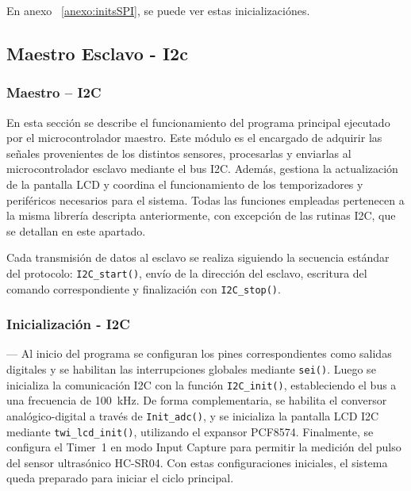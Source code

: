 En anexo ~\ref{anexo:initsSPI}, se puede ver estas inicializaciónes. 


\subsection{Maestro Esclavo - I2c}

\subsubsection{Maestro – I2C}

En esta sección se describe el funcionamiento del programa principal ejecutado por el microcontrolador maestro. Este módulo es el encargado de adquirir las señales provenientes de los distintos sensores, procesarlas y enviarlas al microcontrolador esclavo mediante el bus I2C. Además, gestiona la actualización de la pantalla LCD y coordina el funcionamiento de los temporizadores y periféricos necesarios para el sistema. Todas las funciones empleadas pertenecen a la misma librería descripta anteriormente, con excepción de las rutinas I2C, que se detallan en este apartado.

\vspace{1em}

Cada transmisión de datos al esclavo se realiza siguiendo la secuencia estándar del protocolo: \texttt{I2C\_start()}, envío de la dirección del esclavo, escritura del comando correspondiente y finalización con \texttt{I2C\_stop()}.

\vspace{1em}
\subsubsection{Inicialización - I2C} ---
Al inicio del programa se configuran los pines correspondientes como salidas digitales y se habilitan las interrupciones globales mediante \texttt{sei()}. Luego se inicializa la comunicación I2C con la función \texttt{I2C\_init()}, estableciendo el bus a una frecuencia de 100~kHz. De forma complementaria, se habilita el conversor analógico-digital a través de \texttt{Init\_adc()}, y se inicializa la pantalla LCD I2C mediante \texttt{twi\_lcd\_init()}, utilizando el expansor PCF8574. Finalmente, se configura el Timer~1 en modo Input Capture para permitir la medición del pulso del sensor ultrasónico HC-SR04. Con estas configuraciones iniciales, el sistema queda preparado para iniciar el ciclo principal.


\vspace{1em}
